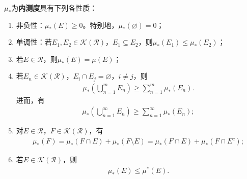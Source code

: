 \documentclass[../../main.tex]{subfiles}%
\begin{document}
\begin{theorem}[内测度的性质]\label{theorem:内测度的基本性质}
$\mu_*$为\textbf{内测度}具有下列各性质：
\begin{enumerate}[(1)]
\item 非负性：$\mu_*(E)\geqslant 0$。特别地，$\mu_*(\varnothing)=0$；
\item 单调性：若$E_1,E_2\in\mathscr{K}(\mathscr{R})$，$E_1\subseteq E_2$，则$\mu_*(E_1)\leqslant \mu_*(E_2)$；
\item 若$E\in\mathscr{R}$，则$\mu_*(E)=\mu(E)$；
\item 若$E_n\in\mathscr{K}(\mathscr{R})$，$E_i\cap E_j=\varnothing$，$i\neq j$，则
\begin{align*}
\mu_*\left(\bigcup\limits_{n=1}^{m}E_n\right)\geqslant \sum\limits_{n=1}^{m}\mu_*(E_n).
\end{align*}
进而，有
\begin{align*}
\mu_*\left(\bigcup\limits_{n=1}^{\infty}E_n\right)\geqslant \sum\limits_{n=1}^{\infty}\mu_*(E_n);
\end{align*}
\item 对$E\in\mathscr{R}$，$F\in\mathscr{K}(\mathscr{R})$，有
\begin{align*}
\mu_*(F) = \mu_*(F\cap E) + \mu_*(F\setminus E) 
= \mu_*(F\cap E) + \mu_*(F\cap E^c);
\end{align*}
\item 若$E\in\mathscr{K}(\mathscr{R})$，则
\begin{align*}
\mu_*(E)\leqslant \mu^*(E).
\end{align*}
\end{enumerate}
\end{theorem}
\end{document}
